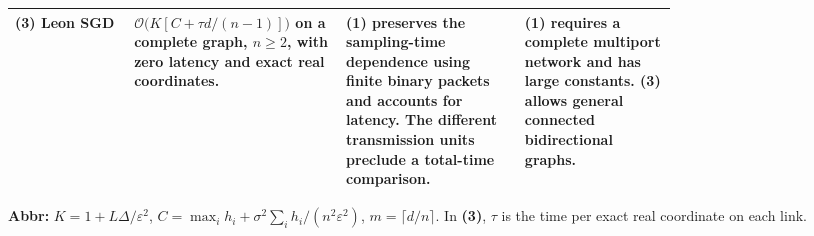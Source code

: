\begin{table}[tp]
\begin{threeparttable}
\begin{tabularx}{\linewidth}{@{}>{\raggedright\arraybackslash}p{0.18\linewidth}>{\raggedright\arraybackslash}p{0.32\linewidth}>{\raggedright\arraybackslash}p{0.27\linewidth}>{\raggedright\arraybackslash}X@{}}
\midrule
\textbf{(3)} Leon SGD \citep[Thm.~1.7]{bhTyurinLeonV1}
& $\mathcal{O}\bigl(K[C+\tau d/(n-1)]\bigr)$ on a complete graph, $n\ge2$, with zero latency and exact real coordinates.
& \textbf{(1)} preserves the sampling-time dependence using finite binary packets and accounts for latency. The different transmission units preclude a total-time comparison.
& \textbf{(1)} requires a complete multiport network and has large constants. \textbf{(3)} allows general connected bidirectional graphs. \\
\bottomrule
\end{tabularx}
\begin{tablenotes}[flushleft]\footnotesize
\item[] \textbf{Abbr:} $K=1+L\Delta/\varepsilon^2$, $C=\max_i h_i+\sigma^2\sum_i h_i/(n^2\varepsilon^2)$, $m=\lceil d/n\rceil$. In \textbf{(3)}, $\tau$ is the time per exact real coordinate on each link.
\end{tablenotes}
\end{threeparttable}
\end{table}
